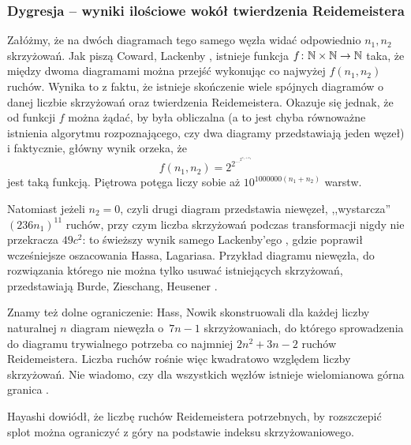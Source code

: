 \subsubsection{Dygresja -- wyniki ilościowe wokół twierdzenia Reidemeistera}
Załóżmy, że na dwóch diagramach tego samego węzła widać odpowiednio $n_1, n_2$ skrzyżowań.
Jak piszą Coward, Lackenby \cite{coward2011}, istnieje funkcja $f \colon \mathbb N \times \mathbb N \to \mathbb N$ taka, że między dwoma diagramami można przejść wykonując co najwyżej $f(n_1, n_2)$ ruchów.
%
%
Wynika to z faktu, że istnieje skończenie wiele spójnych diagramów o danej liczbie skrzyżowań oraz twierdzenia Reidemeistera.
Okazuje się jednak, że od funkcji $f$ można żądać, by była obliczalna
(a to jest chyba równoważne istnienia algorytmu rozpoznającego, czy dwa diagramy przedstawiają jeden węzeł)
i faktycznie, główny wynik \cite{coward2011} orzeka, że
\begin{equation}
    f(n_1, n_2) = 2^{2^{\ldots^{2^{n_1 + n_2}}}}
\end{equation}
jest taką funkcją.
Piętrowa potęga liczy sobie aż $10^{1000000 (n_1 + n_2)}$ warstw.

Natomiast jeżeli $n_2 = 0$, czyli drugi diagram przedstawia niewęzeł, ,,wystarcza'' $(236n_1)^{11}$ ruchów, przy czym liczba skrzyżowań podczas transformacji nigdy nie przekracza $49c^2$: to świeższy wynik samego Lackenby'ego \cite{lackenby2015}, gdzie poprawił wcześniejsze oszacowania Hassa, Lagariasa.
%
Przykład diagramu niewęzła, do rozwiązania którego nie można tylko usuwać istniejących skrzyżowań, przedstawiają Burde, Zieschang, Heusener \cite[s. 12]{burde2014}.

Znamy też dolne ograniczenie: Hass, Nowik \cite{hass2010} skonstruowali dla każdej liczby naturalnej $n$ diagram niewęzła o~$7n - 1$ skrzyżowaniach, do którego sprowadzenia do diagramu trywialnego potrzeba co najmniej $2n^2 + 3n - 2$ ruchów Reidemeistera.
%
%
Liczba ruchów rośnie więc kwadratowo względem liczby skrzyżowań.
Nie wiadomo, czy dla wszystkich węzłów istnieje wielomianowa górna granica \cite[problem 1.77]{baykur2026}.

Hayashi \cite{hayashi2005} dowiódł, że liczbę ruchów Reidemeistera potrzebnych, by rozszczepić splot można ograniczyć z góry na podstawie indeksu skrzyżowaniowego.
%


